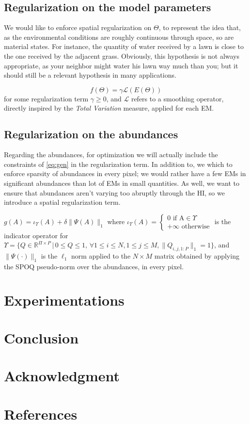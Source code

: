 \documentclass[conference]{IEEEtran}
\begin{document}
\subsection{Regularization on the model parameters}
We would like to enforce spatial regularization on $\Theta$, to represent the idea that, as the environmental conditions are roughly continuous through space, so are material states. For instance, the quantity of water received by a lawn is close to the one received by the adjacent grass. Obviously, this hypothesis is not always appropriate, as your neighbor might water his lawn way much than you; but it should still be a relevant hypothesis in many applications.

$$f(\Theta) = \gamma \mathcal{L}(E(\Theta))$$ for some regularization term $\gamma \geq 0$, and $\mathcal{L}$ refers to a smoothing operator, directly inspired by the \emph{Total Variation} measure, applied for each EM.

\subsection{Regularization on the abundances}
Regarding the abundances, for optimization we will actually include the constraints of \ref{eq:gen} in the regularization term. In addition to, we which to enforce sparsity of abundances in every pixel; we would rather have a few EMs in significant abundances than lot of EMs in small quantities. As well, we want to ensure that abundances aren't varying too abruptly through the HI, so we introduce a spatial regularization term.

$g(A) = \iota_\Upsilon(A) + \delta \| \Psi(A) \|_{1}$ where $\iota_\Upsilon (A) = \begin{cases} 0 \text{ if A}\in \Upsilon\\ +\infty \text{ otherwise} \end{cases}$ is the indicator operator for $\Upsilon = \{Q \in \mathbb{R}^{\Pi \times P}\, |\, 0 \leq Q \leq 1,\, \forall 1 \leq i \leq N, 1 \leq j \leq M, \| Q_{i, j, 1:P} \|_1 = 1\}$, and $\| \Psi(\cdot) \|_{1}$ is the $\ell_1$ norm applied to the $N \times M$ matrix obtained by applying the SPOQ pseudo-norm over the abundances, in every pixel.

\section{Experimentations}

\section{Conclusion}

\section*{Acknowledgment}

\section*{References}



\end{document}
